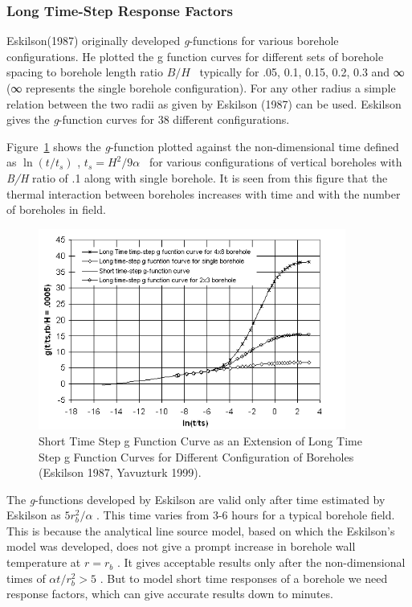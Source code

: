 \subsubsection{Long Time-Step Response Factors}\label{long-time-step-response-factors}

Eskilson(1987) originally developed \emph{g}-functions for various borehole configurations. He plotted the g function curves for different sets of borehole spacing to borehole length ratio \(B/H\) ~typically for .05, 0.1, 0.15, 0.2, 0.3 and ∞ (∞ represents the single borehole configuration). For any other radius a simple relation between the two radii as given by Eskilson (1987) can be used. Eskilson gives the \emph{g}-function curves for 38 different configurations.

Figure~\ref{fig:short-time-step-g-function-curve-as-an} shows the \emph{g}-function plotted against the non-dimensional time defined as \(\ln (t/{t_s})\) , \({t_s} = {H^2}/9\alpha\) ~for various configurations of vertical boreholes with \emph{B/H} ratio of .1 along with single borehole. It is seen from this figure that the thermal interaction between boreholes increases with time and with the number of boreholes in field.

\begin{figure}[hbtp] %
\centering
\includegraphics[width=0.9\textwidth, height=0.9\textheight, keepaspectratio=true]{media/image5651.png}
\caption{Short Time Step g Function Curve as an Extension of Long Time Step g Function Curves for Different Configuration of Boreholes (Eskilson 1987, Yavuzturk 1999). \protect \label{fig:short-time-step-g-function-curve-as-an}}
\end{figure}

The \emph{g}-functions developed by Eskilson are valid only after time estimated by Eskilson as \(5r_b^2/\alpha\) . This time varies from 3-6 hours for a typical borehole field. This is because the analytical line source model, based on which the Eskilson's model was developed, does not give a prompt increase in borehole wall temperature at \(r = {r_b}\) . It gives acceptable results only after the non-dimensional times of \(\alpha t/r_b^2 > 5\) . But to model short time responses of a borehole we need response factors, which can give accurate results down to minutes.

